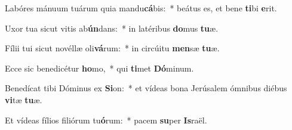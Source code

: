 \item Labóres mánuum tuárum quia mandu\textbf{cá}bis:~* beátus es, et bene \textbf{ti}bi \textbf{e}rit.
\item Uxor tua sicut vitis ab\textbf{ún}dans:~* in latéribus \textbf{do}mus \textbf{tu}æ.
\item Fílii tui sicut novéllæ oli\textbf{vá}rum:~* in circúitu \textbf{men}sæ \textbf{tu}æ.
\item Ecce sic benedicétur \textbf{ho}mo,~* qui \textbf{ti}met \textbf{Dó}minum.
\item Benedícat tibi Dóminus ex \textbf{Si}on:~* et vídeas bona Jerúsalem ómnibus diébus \textbf{vi}tæ \textbf{tu}æ.
\item Et vídeas fílios filiórum tu\textbf{ó}rum:~* pacem \textbf{su}per \textbf{Is}raël.

